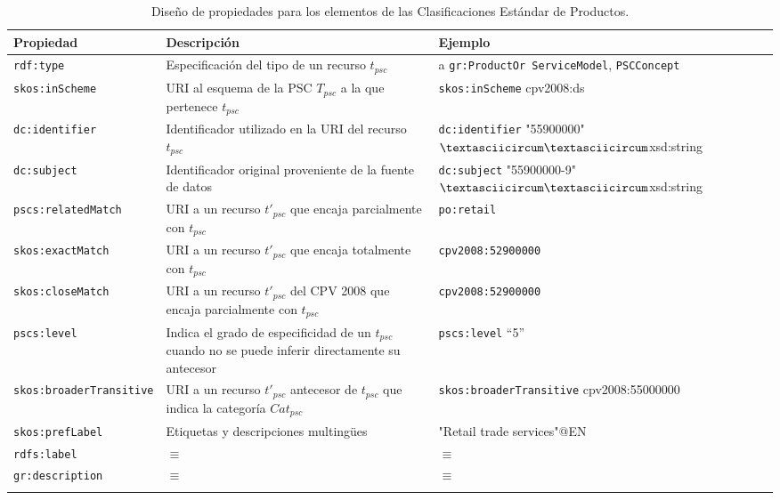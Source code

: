 \begin{longtable}[c]{|p{5cm}|p{4.5cm}|p{5cm}|} 
\hline
  \textbf{Propiedad} &  \textbf{Descripción} & \textbf{Ejemplo} \\\hline
  \texttt{rdf:type} & Especificación del tipo de un recurso $t_{psc}$ & a \texttt{gr:ProductOr ServiceModel}, \texttt{PSCConcept} \\ \hline
  \texttt{skos:inScheme} & \gls{URI} al esquema de la PSC $T_{psc}$ a la que pertenece $t_{psc}$ & \texttt{skos:inScheme} cpv2008:ds \\ \hline
  \texttt{dc:identifier} & Identificador utilizado en la URI del recurso $t_{psc}$ &  \texttt{dc:identifier} "55900000"$\textasciicircum\textasciicircum$xsd:string \\ \hline
  \texttt{dc:subject} & Identificador original proveniente de la fuente de datos &  \texttt{dc:subject} "55900000-9"$\textasciicircum\textasciicircum$xsd:string \\ \hline
  \texttt{pscs:relatedMatch} & URI a un recurso $t'_{psc}$ que encaja parcialmente con $t_{psc}$ & \texttt{po:retail} \\ \hline
  \texttt{skos:exactMatch } & URI a un recurso $t'_{psc}$ que encaja totalmente con $t_{psc}$ & \texttt{cpv2008:52900000} \\ \hline
  \texttt{skos:closeMatch } & URI a un recurso $t'_{psc}$ del CPV 2008 que encaja parcialmente con $t_{psc}$ & \texttt{cpv2008:52900000} \\ \hline
  \texttt{pscs:level} & Indica el grado de especificidad de un $t_{psc}$ cuando no se puede inferir directamente su antecesor & \texttt{pscs:level} ``5'' \\ \hline  
  \texttt{skos:broaderTransitive} & URI a un recurso $t'_{psc}$ antecesor de $t_{psc}$ que indica la categoría $Cat_{psc}$ & \texttt{skos:broaderTransitive} cpv2008:55000000 \\ \hline
  \texttt{skos:prefLabel} & Etiquetas y descripciones multing\"{u}es &  "Retail trade services"@EN \\ \hline
  \texttt{rdfs:label} & $\equiv$ &  $\equiv$\\ \hline
  \texttt{gr:description} & $\equiv$ &  $\equiv$ \\ \hline
\endhead
\hline
\caption{Diseño de propiedades para los elementos de las Clasificaciones Estándar de Productos.}\label{table:pscs-rdf-model}\\    
\end{longtable}




